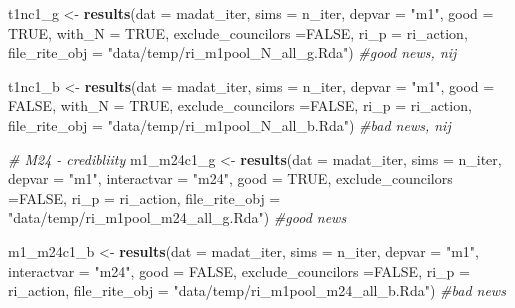 \documentclass[]{article}
\newenvironment{Shaded}{\begin{snugshade}}{\end{snugshade}}
\newcommand{\KeywordTok}[1]{\textcolor[rgb]{0.13,0.29,0.53}{\textbf{#1}}}
\newcommand{\DataTypeTok}[1]{\textcolor[rgb]{0.13,0.29,0.53}{#1}}
\newcommand{\StringTok}[1]{\textcolor[rgb]{0.31,0.60,0.02}{#1}}
\newcommand{\CommentTok}[1]{\textcolor[rgb]{0.56,0.35,0.01}{\textit{#1}}}
\newcommand{\OtherTok}[1]{\textcolor[rgb]{0.56,0.35,0.01}{#1}}
\newcommand{\NormalTok}[1]{#1}
\begin{document}
\begin{Shaded}
\begin{Highlighting}[]
\NormalTok{t1nc1_g <-}\StringTok{ }\KeywordTok{results}\NormalTok{(}\DataTypeTok{dat =}\NormalTok{ madat_iter, }\DataTypeTok{sims =}\NormalTok{ n_iter, }\DataTypeTok{depvar =} \StringTok{"m1"}\NormalTok{, }\DataTypeTok{good =} \OtherTok{TRUE}\NormalTok{, }\DataTypeTok{with_N =} \OtherTok{TRUE}\NormalTok{, }\DataTypeTok{exclude_councilors =}\OtherTok{FALSE}\NormalTok{,}
                   \DataTypeTok{ri_p =}\NormalTok{ ri_action, }\DataTypeTok{file_rite_obj =} \StringTok{"data/temp/ri_m1pool_N_all_g.Rda"}\NormalTok{)   }\CommentTok{#good news, nij}

\NormalTok{t1nc1_b <-}\StringTok{ }\KeywordTok{results}\NormalTok{(}\DataTypeTok{dat =}\NormalTok{ madat_iter, }\DataTypeTok{sims =}\NormalTok{ n_iter, }\DataTypeTok{depvar =} \StringTok{"m1"}\NormalTok{, }\DataTypeTok{good =} \OtherTok{FALSE}\NormalTok{, }\DataTypeTok{with_N =} \OtherTok{TRUE}\NormalTok{, }\DataTypeTok{exclude_councilors =}\OtherTok{FALSE}\NormalTok{,}
                   \DataTypeTok{ri_p =}\NormalTok{ ri_action, }\DataTypeTok{file_rite_obj =} \StringTok{"data/temp/ri_m1pool_N_all_b.Rda"}\NormalTok{)  }\CommentTok{#bad news, nij}
\end{Highlighting}
\end{Shaded}

\begin{Shaded}
\begin{Highlighting}[]
\CommentTok{# M24 - credibliity}
\NormalTok{m1_m24c1_g <-}\StringTok{ }\KeywordTok{results}\NormalTok{(}\DataTypeTok{dat =}\NormalTok{ madat_iter, }\DataTypeTok{sims =}\NormalTok{ n_iter, }\DataTypeTok{depvar =} \StringTok{"m1"}\NormalTok{, }\DataTypeTok{interactvar =} \StringTok{"m24"}\NormalTok{, }\DataTypeTok{good =} \OtherTok{TRUE}\NormalTok{, }\DataTypeTok{exclude_councilors =}\OtherTok{FALSE}\NormalTok{,}
                      \DataTypeTok{ri_p =}\NormalTok{ ri_action, }\DataTypeTok{file_rite_obj =} \StringTok{"data/temp/ri_m1pool_m24_all_g.Rda"}\NormalTok{) }\CommentTok{#good news}

\NormalTok{m1_m24c1_b <-}\StringTok{ }\KeywordTok{results}\NormalTok{(}\DataTypeTok{dat =}\NormalTok{ madat_iter, }\DataTypeTok{sims =}\NormalTok{ n_iter, }\DataTypeTok{depvar =} \StringTok{"m1"}\NormalTok{, }\DataTypeTok{interactvar =} \StringTok{"m24"}\NormalTok{, }\DataTypeTok{good =} \OtherTok{FALSE}\NormalTok{, }\DataTypeTok{exclude_councilors =}\OtherTok{FALSE}\NormalTok{,}
                      \DataTypeTok{ri_p =}\NormalTok{ ri_action, }\DataTypeTok{file_rite_obj =} \StringTok{"data/temp/ri_m1pool_m24_all_b.Rda"}\NormalTok{) }\CommentTok{#bad news}
\end{Highlighting}
\end{Shaded}
\end{document}

